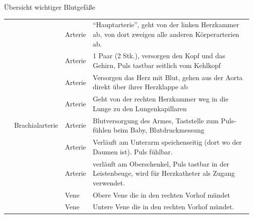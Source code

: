 \TableWide
{Übersicht wichtiger Blutgefäße}%
{}%
{\label{topic:blutgefaesse-wichtige}\label{topic:pfortader}}%
{}%
{}%
{%
\noindent\begin{tabulary}{\linewidth}{lllL}
\addlinespace\toprule\addlinespace
\noindent{}
&
\noindent{}
&
\noindent{}
&
\noindent{}
\\\midrule\addlinespace
{} 
&
 
&
Arterie
&
\protect\enquote{Hauptarterie}, geht von der linken
Herzkammer ab, von dort zweigen alle
anderen Körperarterien ab.
\\\addlinespace
{} 
&
 
&
Arterie
&
1 Paar (2 Stk.), versorgen den Kopf und das Gehirn, Puls tastbar seitlich vom
Kehlkopf
\\\addlinespace
{} 
&
 
&
Arterie
&
Versorgen das Herz mit Blut, gehen aus der Aorta direkt über ihrer Herzklappe ab
\\\addlinespace
{} 
&
 
&
Arterie
&
\noindent{} Geht von der rechten Herzkammer weg in
die Lunge zu den Lungenkapillaren
\\\addlinespace
{} 
&
Brachialarterie
&
Arterie
&
Blutversorgung des Armes, Taststelle zum Puls-fühlen beim Baby, Blutdruckmessung
\\\addlinespace
{} 
&
&
Arterie
&
Verläuft am Unterarm speichenseitig (dort wo der Daumen ist). Puls
fühlbar.
\\\addlinespace
{} 
&
 
&
Arterie
&
verläuft am Oberschenkel, Puls tastbar in der Leistenbeuge, wird für
Herzkatheter als Zugang verwendet. 
\\\addlinespace
{} 
&
  
&
Vene
&
Obere Vene die in den rechten Vorhof mündet
\\\addlinespace
{}
&
  
&
Vene
&
Untere Vene die in den rechten Vorhof mündet.

\end{tabulary}}
